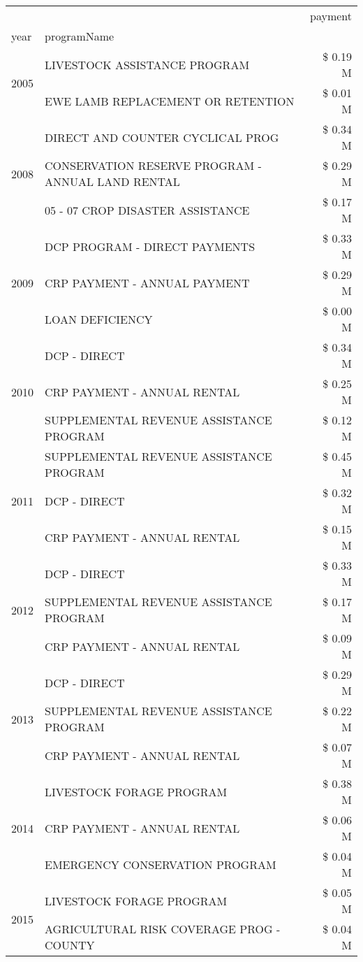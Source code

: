\begin{tabular}{llr}
\toprule
 &  & payment \\
year & programName &  \\
\midrule
\multirow[t]{2}{*}{2005} & LIVESTOCK ASSISTANCE PROGRAM & \$ 0.19 M \\
 & EWE LAMB REPLACEMENT OR RETENTION & \$ 0.01 M \\
\cline{1-3}
\multirow[t]{3}{*}{2008} & DIRECT AND COUNTER CYCLICAL PROG & \$ 0.34 M \\
 & CONSERVATION RESERVE PROGRAM - ANNUAL LAND RENTAL & \$ 0.29 M \\
 & 05 - 07 CROP DISASTER ASSISTANCE & \$ 0.17 M \\
\cline{1-3}
\multirow[t]{3}{*}{2009} & DCP PROGRAM - DIRECT PAYMENTS & \$ 0.33 M \\
 & CRP PAYMENT - ANNUAL PAYMENT & \$ 0.29 M \\
 & LOAN DEFICIENCY & \$ 0.00 M \\
\cline{1-3}
\multirow[t]{3}{*}{2010} & DCP - DIRECT & \$ 0.34 M \\
 & CRP PAYMENT - ANNUAL RENTAL & \$ 0.25 M \\
 & SUPPLEMENTAL REVENUE ASSISTANCE PROGRAM & \$ 0.12 M \\
\cline{1-3}
\multirow[t]{3}{*}{2011} & SUPPLEMENTAL REVENUE ASSISTANCE PROGRAM & \$ 0.45 M \\
 & DCP - DIRECT & \$ 0.32 M \\
 & CRP PAYMENT - ANNUAL RENTAL & \$ 0.15 M \\
\cline{1-3}
\multirow[t]{3}{*}{2012} & DCP - DIRECT & \$ 0.33 M \\
 & SUPPLEMENTAL REVENUE ASSISTANCE PROGRAM & \$ 0.17 M \\
 & CRP PAYMENT - ANNUAL RENTAL & \$ 0.09 M \\
\cline{1-3}
\multirow[t]{3}{*}{2013} & DCP - DIRECT & \$ 0.29 M \\
 & SUPPLEMENTAL REVENUE ASSISTANCE PROGRAM & \$ 0.22 M \\
 & CRP PAYMENT - ANNUAL RENTAL & \$ 0.07 M \\
\cline{1-3}
\multirow[t]{3}{*}{2014} & LIVESTOCK FORAGE PROGRAM & \$ 0.38 M \\
 & CRP PAYMENT - ANNUAL RENTAL & \$ 0.06 M \\
 & EMERGENCY CONSERVATION PROGRAM & \$ 0.04 M \\
\cline{1-3}
\multirow[t]{3}{*}{2015} & LIVESTOCK FORAGE PROGRAM & \$ 0.05 M \\
 & AGRICULTURAL RISK COVERAGE PROG - COUNTY & \$ 0.04 M \\

\end{tabular}
